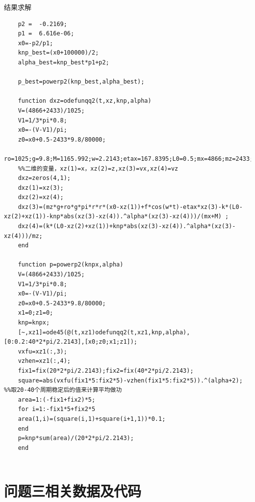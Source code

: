 \documentclass{article}
\numberwithin{equation}{subsection}
\begin{document}
结果求解
\begin{lstlisting}
    p2 =  -0.2169;
    p1 =  6.616e-06;
    x0=-p2/p1;
    knp_best=(x0+100000)/2;
    alpha_best=knp_best*p1+p2;
    
    p_best=powerp2(knp_best,alpha_best);
    
    function dxz=odefunqq2(t,xz,knp,alpha)
    V=(4866+2433)/1025; 
    V1=1/3*pi*0.8; 
    x0=-(V-V1)/pi;
    z0=x0+0.5-2433*9.8/80000;
    ro=1025;g=9.8;M=1165.992;w=2.2143;etax=167.8395;L0=0.5;mx=4866;mz=2433;r=1;f=4890;k=80000;
    %%二维的变量，xz(1)=x，xz(2)=z,xz(3)=vx,xz(4)=vz 
    dxz=zeros(4,1); 
    dxz(1)=xz(3); 
    dxz(2)=xz(4);
    dxz(3)=(mz*g+ro*g*pi*r*r*(x0-xz(1))+f*cos(w*t)-etax*xz(3)-k*(L0-xz(2)+xz(1))-knp*abs(xz(3)-xz(4)).^alpha*(xz(3)-xz(4)))/(mx+M) ;
    dxz(4)=(k*(L0-xz(2)+xz(1))+knp*abs(xz(3)-xz(4)).^alpha*(xz(3)-xz(4)))/mz; 
    end
    
    function p=powerp2(knpx,alpha)
    V=(4866+2433)/1025;
    V1=1/3*pi*0.8;
    x0=-(V-V1)/pi;
    z0=x0+0.5-2433*9.8/80000;
    x1=0;z1=0;
    knp=knpx;
    [~,xz1]=ode45(@(t,xz1)odefunqq2(t,xz1,knp,alpha),[0:0.2:40*2*pi/2.2143],[x0;z0;x1;z1]);
    vxfu=xz1(:,3);
    vzhen=xz1(:,4);
    fix1=fix(20*2*pi/2.2143);fix2=fix(40*2*pi/2.2143);
    square=abs(vxfu(fix1*5:fix2*5)-vzhen(fix1*5:fix2*5)).^(alpha+2); %%取20-40个周期稳定后的值来计算平均做功
    area=1:(-fix1+fix2)*5;
    for i=1:-fix1*5+fix2*5
    area(1,i)=(square(i,1)+square(i+1,1))*0.1;
    end
    p=knp*sum(area)/(20*2*pi/2.2143);
    end
    
\end{lstlisting}


\section{问题三相关数据及代码}
\end{document}
